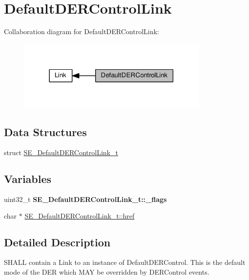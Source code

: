 \hypertarget{group__DefaultDERControlLink}{}\section{Default\+D\+E\+R\+Control\+Link}
\label{group__DefaultDERControlLink}
Collaboration diagram for Default\+D\+E\+R\+Control\+Link\+:\nopagebreak
\begin{figure}[H]
\begin{center}
\leavevmode
\includegraphics[width=270pt]{group__DefaultDERControlLink}
\end{center}
\end{figure}
\subsection*{Data Structures}
\begin{DoxyCompactItemize}
\item 
struct \hyperlink{structSE__DefaultDERControlLink__t}{S\+E\+\_\+\+Default\+D\+E\+R\+Control\+Link\+\_\+t}
\end{DoxyCompactItemize}
\subsection*{Variables}
\begin{DoxyCompactItemize}
\item 
\mbox{\label{group__DefaultDERControlLink_gac462fd323c2ee2a1b4637aec1730d597}} 
uint32\+\_\+t {\bfseries S\+E\+\_\+\+Default\+D\+E\+R\+Control\+Link\+\_\+t\+::\+\_\+flags}
\item 
char $\ast$ \hyperlink{group__DefaultDERControlLink_ga57a5c89d55f6ff1c04b198b50a6257ad}{S\+E\+\_\+\+Default\+D\+E\+R\+Control\+Link\+\_\+t\+::href}
\end{DoxyCompactItemize}


\subsection{Detailed Description}
S\+H\+A\+LL contain a Link to an instance of Default\+D\+E\+R\+Control. This is the default mode of the D\+ER which M\+AY be overridden by D\+E\+R\+Control events. 

